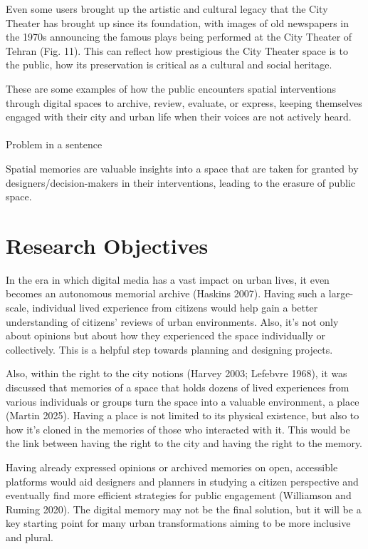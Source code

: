 \documentclass[
  letterpaper,
  DIV=11,
  numbers=noendperiod]{scrartcl}
\makeatletter
\let\oldparagraph\paragraph
\renewcommand{\paragraph}{
    \@ifstar
      \xxxParagraphStar
      \xxxParagraphNoStar
  }
\newcommand{\xxxParagraphStar}[1]{\oldparagraph*{#1}\mbox{}}
\newcommand{\xxxParagraphNoStar}[1]{\oldparagraph{#1}\mbox{}}
\makeatother
\begin{document}
Even some users brought up the artistic and cultural legacy that the
City Theater has brought up since its foundation, with images of old
newspapers in the 1970s announcing the famous plays being performed at
the City Theater of Tehran (Fig. 11). This can reflect how prestigious
the City Theater space is to the public, how its preservation is
critical as a cultural and social heritage.

These are some examples of how the public encounters spatial
interventions through digital spaces to archive, review, evaluate, or
express, keeping themselves engaged with their city and urban life when
their voices are not actively heard.

\paragraph{Problem in a sentence}\label{problem-in-a-sentence}

Spatial memories are valuable insights into a space that are taken for
granted by designers/decision-makers in their interventions, leading to
the erasure of public space.

\newpage{}

\section{Research Objectives}\label{research-objectives}

In the era in which digital media has a vast impact on urban lives, it
even becomes an autonomous memorial archive (Haskins 2007). Having such
a large-scale, individual lived experience from citizens would help gain
a better understanding of citizens' reviews of urban environments. Also,
it's not only about opinions but about how they experienced the space
individually or collectively. This is a helpful step towards planning
and designing projects.

Also, within the right to the city notions (Harvey 2003; Lefebvre 1968),
it was discussed that memories of a space that holds dozens of lived
experiences from various individuals or groups turn the space into a
valuable environment, a place (Martin 2025). Having a place is not
limited to its physical existence, but also to how it's cloned in the
memories of those who interacted with it. This would be the link between
having the right to the city and having the right to the memory.

Having already expressed opinions or archived memories on open,
accessible platforms would aid designers and planners in studying a
citizen perspective and eventually find more efficient strategies for
public engagement (Williamson and Ruming 2020). The digital memory may
not be the final solution, but it will be a key starting point for many
urban transformations aiming to be more inclusive and plural.
\end{document}
